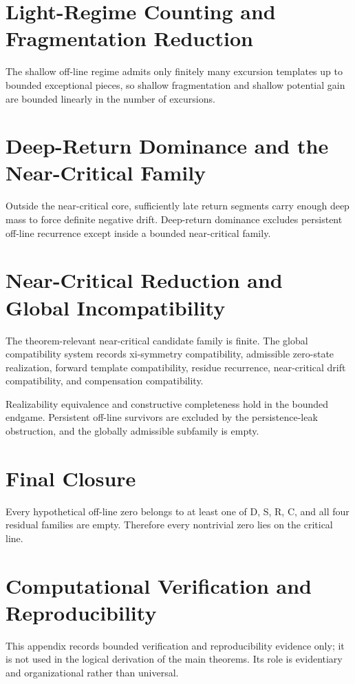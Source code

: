 \documentclass[11pt,a4paper]{article}
\begin{document}
\section{Light-Regime Counting and Fragmentation Reduction}
The shallow off-line regime admits only finitely many excursion templates up to bounded exceptional pieces, so shallow fragmentation and shallow potential gain are bounded linearly in the number of excursions.

\section{Deep-Return Dominance and the Near-Critical Family}
Outside the near-critical core, sufficiently late return segments carry enough deep mass to force definite negative drift. Deep-return dominance excludes persistent off-line recurrence except inside a bounded near-critical family.

\section{Near-Critical Reduction and Global Incompatibility}
The theorem-relevant near-critical candidate family is finite. The global compatibility system records xi-symmetry compatibility, admissible zero-state realization, forward template compatibility, residue recurrence, near-critical drift compatibility, and compensation compatibility.

Realizability equivalence and constructive completeness hold in the bounded endgame. Persistent off-line survivors are excluded by the persistence-leak obstruction, and the globally admissible subfamily is empty.

\section{Final Closure}
Every hypothetical off-line zero belongs to at least one of D, S, R, C, and all four residual families are empty. Therefore every nontrivial zero lies on the critical line.

\appendix
\section{Computational Verification and Reproducibility}
This appendix records bounded verification and reproducibility evidence only; it is not used in the logical derivation of the main theorems. Its role is evidentiary and organizational rather than universal.
\end{document}
